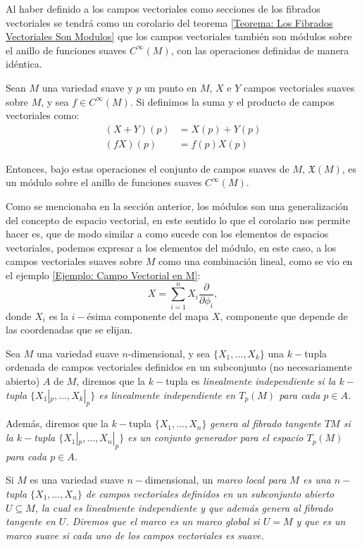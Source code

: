 Al haber definido a los campos vectoriales como secciones de los fibrados vectoriales se tendrá como un corolario del teorema \ref{Teorema: Los Fibrados Vectoriales Son Modulos} que los campos vectoriales también son módulos sobre el anillo de funciones suaves $C^{\infty}(M)$, con las operaciones definidas de manera idéntica.

\begin{corollary}
	Sean $M$ una variedad suave y $p$ un punto en $M$, $X$ e $Y$ campos vectoriales suaves sobre $M$, y sea $f \in C^{\infty}(M)$. Si definimos la suma y el producto de campos vectoriales como:
	\begin{align*}
		(X + Y)(p) & = X(p) + Y(p) \\
		(fX)(p)    & = f(p)X(p)
	\end{align*}

	Entonces, bajo estas operaciones el conjunto de campos suaves de $M$, $\mathfrak{X}(M)$, es un módulo sobre el anillo de funciones suaves $C^{\infty}(M)$.
\end{corollary}

Como se mencionaba en la sección anterior, los módulos son una generalización del concepto de espacio vectorial, en este sentido lo que el corolario nos permite hacer es, que de modo similar a como sucede con los elementos de espacios vectoriales, podemos expresar a los elementos del módulo, en este caso, a los campos vectoriales suaves sobre $M$ como una combinación lineal, como se vio en el ejemplo \ref{Ejemplo: Campo Vectorial en M}:
\[
	X = \sum_{i=1}^{n} X_i \frac{\partial}{\partial \phi_i},
\]
donde $X_i$ es la $i-$ésima componente del mapa $X$, componente que depende de las coordenadas que se elijan.

\begin{definition}
	Sea $M$ una variedad suave $n$-dimensional, y sea $\{X_1,\ldots,X_k\}$ una $k-$tupla ordenada de campos vectoriales definidos en un subconjunto (no necesariamente abierto) $A$ de $M$, diremos que la $k-$tupla es \it{linealmente independiente} si la $k-$tupla $\{X_1|_{p}, \ldots, X_k|_{p}\}$ es linealmente independiente en $T_p(M)$ para cada $p \in A$.

	Además, diremos que la $k-$tupla $\{X_1, \ldots, X_n\}$ \it{genera al fibrado tangente} $TM$ si la $k-$tupla $\{X_1|_p, \ldots, X_n|_p \}$ es un conjunto generador para el espacio $T_p(M)$ para cada $p \in A$.
\end{definition}

\begin{definition}
	Si $M$ es una variedad suave $n-$dimensional, un \it{marco local para $M$} es una $n-$tupla $\{X_1, \ldots, X_n\}$ de campos vectoriales definidos en un subconjunto abierto $U \subseteq M$, la cual es linealmente independiente y que además genera al fibrado tangente en $U$. Diremos que el marco es un \it{marco global} si $U = M$ y que es un \it{marco suave} si cada uno de los campos vectoriales es suave.
\end{definition}

